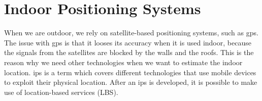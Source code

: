 \section{Indoor Positioning Systems}
When we are outdoor, we rely on satellite-based positioning systems, such as \gls{gps}. The issue with \gls{gps} is that it looses its accuracy when it is used indoor, because the signals from the satellites are blocked by the walls and the roofs. This is the reason why we need other technologies when we want to estimate the indoor location. \gls{ips} is a term which covers different technologies that use mobile devices to exploit their physical location. After an \gls{ips} is developed, it is possible to make use of location-based services (LBS).





